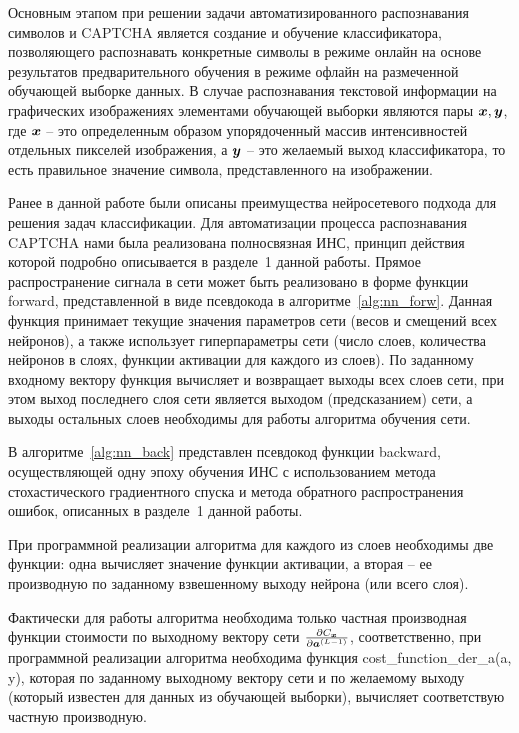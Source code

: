 \documentclass[a4paper,12pt,russian]{article} %
\begin{document}
Основным этапом при решении задачи автоматизированного распознавания символов и CAPTCHA является создание и обучение классификатора, позволяющего распознавать конкретные символы в режиме онлайн на основе результатов предварительного обучения в режиме офлайн на размеченной обучающей выборке данных.
В случае распознавания текстовой информации на графических изображениях элементами обучающей выборки являются пары $\bm{x}, \bm{y}$, где $\bm{x}$ -- это определенным образом упорядоченный массив интенсивностей отдельных пикселей изображения, а $\bm{y}$ -- это желаемый выход классификатора, то есть правильное значение символа, представленного на изображении.

Ранее в данной работе были описаны преимущества нейросетевого подхода для решения задач классификации.
Для автоматизации процесса распознавания CAPTCHA нами была реализована полносвязная ИНС, принцип действия которой подробно описывается в разделе~1 данной работы.
Прямое распространение сигнала в сети может быть реализовано в форме функции forward, представленной в виде псевдокода в алгоритме~\ref{alg:nn_forw}.
Данная функция принимает текущие значения параметров сети (весов и смещений всех нейронов), а также использует гиперпараметры сети (число слоев, количества нейронов в слоях, функции активации для каждого из слоев).
По заданному входному вектору функция вычисляет и возвращает выходы всех слоев сети, при этом выход последнего слоя сети является выходом (предсказанием) сети, а выходы остальных слоев необходимы для работы алгоритма обучения сети.

В алгоритме~\ref{alg:nn_back} представлен псевдокод функции backward, осуществляющей одну эпоху обучения ИНС с использованием метода стохастического градиентного спуска и метода обратного распространения ошибок, описанных в разделе~1 данной работы.

При программной реализации алгоритма для каждого из слоев необходимы две функции: одна вычисляет значение функции активации, а вторая -- ее производную по заданному взвешенному выходу нейрона (или всего слоя).

Фактически для работы алгоритма необходима только частная производная функции стоимости по выходному вектору сети $\frac{\partial C_{\bm{x}}}{\partial \bm{a}^{(L-1)}}$, соответственно, при программной реализации алгоритма необходима функция cost\_function\_der\_a(a, y), которая по заданному выходному вектору сети и по желаемому выходу (который известен для данных из обучающей выборки), вычисляет соответствую частную производную.
\end{document}
